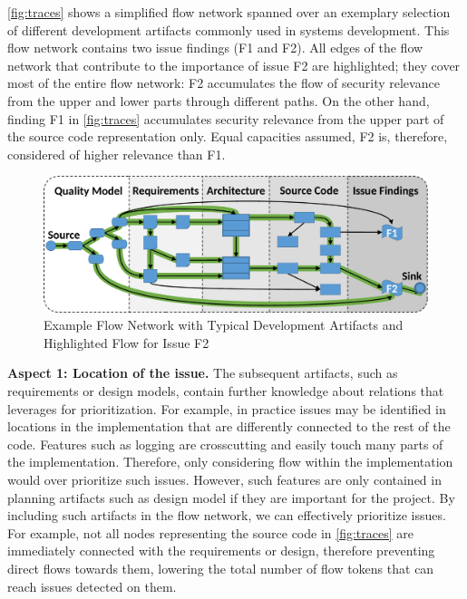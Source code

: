 \autoref{fig:traces} shows a simplified flow network spanned over an exemplary selection of different development artifacts commonly used in systems development.
This flow network contains two issue findings (F1 and F2).
All edges of the flow network that contribute to the importance of issue F2 are highlighted;
they cover most of the entire flow network: F2 accumulates the flow of security relevance from the upper and lower parts through different paths.
On the other hand, finding F1 in \autoref{fig:traces} accumulates security relevance from the upper part of the source code representation only.
Equal capacities assumed, F2 is, therefore, considered of higher relevance than F1.


\begin{figure}
	\centering
	\includegraphics[width=.7\columnwidth]{figures/traces04-KG}%
	\caption{Example Flow Network with Typical Development Artifacts and Highlighted Flow for Issue F2}%
	\label{fig:traces}
\end{figure}

    \textbf{Aspect 1: Location of the issue.} The subsequent artifacts, such as requirements or design models, contain further knowledge about relations that \appr{} leverages for prioritization.
	For example, in practice issues may be identified in locations in the implementation that are differently connected to the rest of the code.
	Features such as logging are crosscutting and easily touch many parts of the implementation.
	Therefore, only considering flow within the implementation would over prioritize such issues.
	However, such features are only contained in planning artifacts such as design model if they are important for the project.
	By including such artifacts in the flow network, we can effectively prioritize issues.
	For example, not all nodes representing the source code in \autoref{fig:traces} are immediately connected with the requirements or design, therefore preventing direct flows towards them, lowering the total number of flow tokens that can reach issues detected on them.

